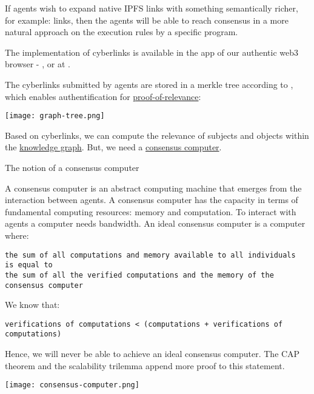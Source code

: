 \documentclass[8pt,oneside]{amsart}
\makeatletter
\newcommand{\linkred}[2]{\href{#1}{\color{red}{#2}}}
\newcommand{\linkgreen}[2]{\href{#1}{\color{green}{#2}}}
\renewcommand\subsection{\@startsection{subsection}
                                    {2}{\z@}
                                    {-3.25ex\@plus -1ex \@minus -.2ex}
                                    {0ex \@plus .2ex}
                                    {\play\Large}
                        }
\newcommand{\titleSection}[1]{\subsection{#1}}
\newenvironment{Figure}
  {\par\medskip\noindent\minipage{\linewidth}}
  {\endminipage\par\medskip}
\makeatother
\begin{document}
If agents wish to expand native IPFS links with something semantically richer, for example:
\linkred{https://github.com/cybercongress/cyb/blob/dev/docs/dura.md}{dura}
links, then the agents will be able to reach consensus in a more natural approach on the execution rules by a specific program.

The \linkred{https://github.com/cybercongress/go-cyber}{сyberd} implementation of cyberlinks is available in the \linkred{https://github.com/cybercongress/dot-cyber}{.cyber} app of our authentic web3 browser - \linkred{https://cyb.ai}{cyb}, or at \linkred{http://cyber.page}{cyber.page}.

The cyberlinks submitted by agents are stored in a merkle tree according to \linkgreen{https://ipfs.io/ipfs/QmUUTW5gpJx7g5QF3PRkhjkk7jqs3r8EWcuVpZ9dHfx7DE}{RFC-6962 standard}, which enables authentification for {\hyperref[proof-of-relevance]{proof-of-relevance}}:

\begin{Figure}
    \centering
    \texttt{[image: graph-tree.png]}
\end{Figure}

Based on cyberlinks, we can compute the relevance of subjects and objects within the {\hyperref[knowledge-graph]{knowledge graph}}. But, we need a {\hyperref[consensus-computer]{consensus computer}}.

\titleSection{The notion of a consensus computer}\label{consensus-computer}

A consensus computer is an abstract computing machine that emerges from the interaction between agents. A consensus computer has the capacity in terms of fundamental computing resources: memory and computation. To interact with agents a computer needs bandwidth. An ideal consensus computer is a computer where:
\\
\begin{lstlisting}
the sum of all computations and memory available to all individuals
is equal to
the sum of all the verified computations and the memory of the consensus computer
\end{lstlisting}

We know that:
\begin{lstlisting}
verifications of computations < (computations + verifications of computations)
\end{lstlisting}

Hence, we will never be able to achieve an ideal consensus computer. The CAP theorem and the scalability trilemma append more proof to this statement.
\begin{Figure}
    \centering
    \texttt{[image: consensus-computer.png]}
\end{Figure}
\end{document}
